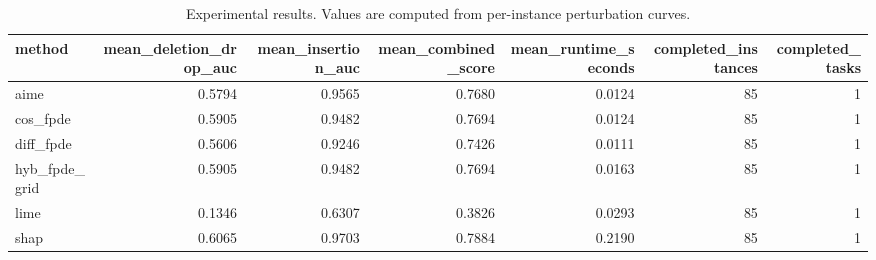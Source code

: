 \begin{table}[t]
\caption{Experimental results. Values are computed from per-instance perturbation curves.}
\label{tab:main_results_computed}
\centering
\begin{tabular}{lrrrrrr}
\toprule
method & mean\_deletion\_drop\_auc & mean\_insertion\_auc & mean\_combined\_score & mean\_runtime\_seconds & completed\_instances & completed\_tasks \\
\midrule
aime & 0.5794 & 0.9565 & 0.7680 & 0.0124 & 85 & 1 \\
cos\_fpde & 0.5905 & 0.9482 & 0.7694 & 0.0124 & 85 & 1 \\
diff\_fpde & 0.5606 & 0.9246 & 0.7426 & 0.0111 & 85 & 1 \\
hyb\_fpde\_grid & 0.5905 & 0.9482 & 0.7694 & 0.0163 & 85 & 1 \\
lime & 0.1346 & 0.6307 & 0.3826 & 0.0293 & 85 & 1 \\
shap & 0.6065 & 0.9703 & 0.7884 & 0.2190 & 85 & 1 \\
\bottomrule
\end{tabular}

\end{table}

